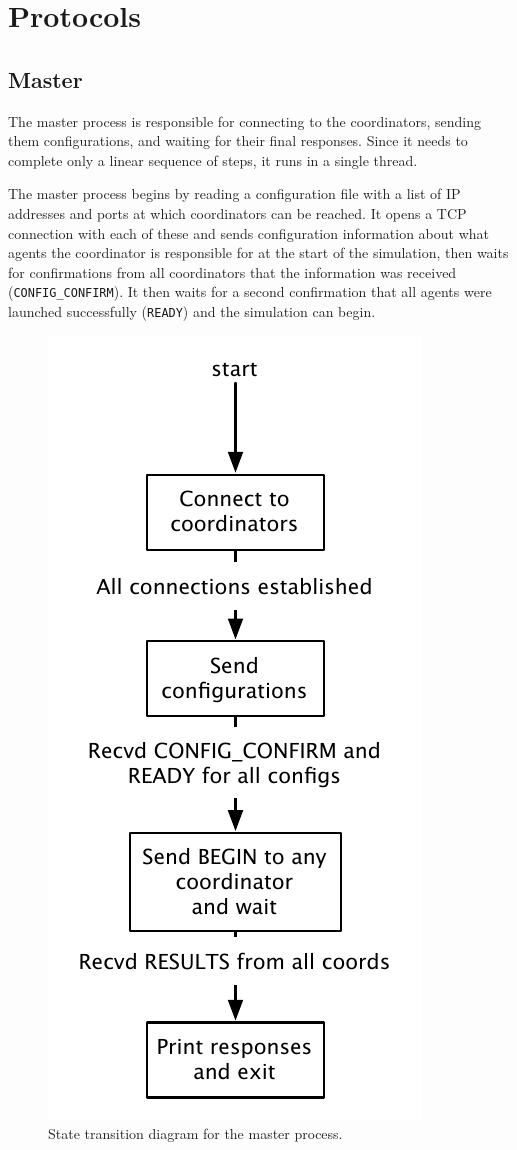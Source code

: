 \section{Protocols}

\subsection{Master}

The master process is responsible for connecting to the coordinators, sending them configurations, and waiting for their final responses. Since it needs to complete only a linear sequence of steps, it runs in a single thread.

The master process begins by reading a configuration file with a list of IP addresses and ports at which coordinators can be reached. It opens a TCP connection with each of these and sends  configuration information about what agents the coordinator is responsible for at the start of the simulation, then waits for confirmations from all coordinators that the information was received (\texttt{CONFIG_CONFIRM}). It then waits for a second confirmation that all agents were launched successfully (\texttt{READY}) and the simulation can begin.

\begin{figure}
    \begin{center}
        \includegraphics[scale=0.5]{figures/state_master.pdf}
    \end{center}
    \caption{State transition diagram for the master process.}
    \label{times}
\end{figure}

